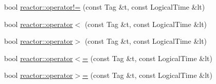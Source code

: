 \begin{DoxyCompactItemize}
bool \hyperlink{namespacereactor_a084a8581290e7446f44cc2ca94c47fdf}{reactor\+::operator!=} (const Tag \&t, const Logical\+Time \&lt)
\item 
bool \hyperlink{namespacereactor_acd3c1262138ace0007602d65740bc806}{reactor\+::operator$<$} (const Tag \&t, const Logical\+Time \&lt)
\item 
bool \hyperlink{namespacereactor_ac9d3f8609a66fbbc8a4d375da18a14e2}{reactor\+::operator$>$} (const Tag \&t, const Logical\+Time \&lt)
\item 
bool \hyperlink{namespacereactor_a187a8a69a9cd1edb808e7c92a7a944a0}{reactor\+::operator$<$=} (const Tag \&t, const Logical\+Time \&lt)
\item 
bool \hyperlink{namespacereactor_adb34cd1dff4f0af83c099efae8c2f0cc}{reactor\+::operator$>$=} (const Tag \&t, const Logical\+Time \&lt)
\end{DoxyCompactItemize}
